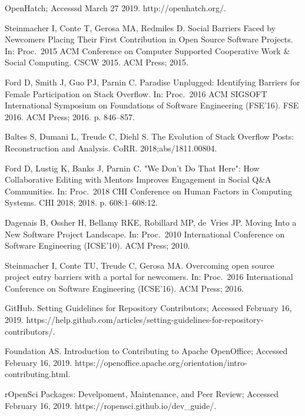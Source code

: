 \documentclass[10pt,letterpaper]{article}
\begin{document}
\begin{thebibliography}{10}
OpenHatch; Accesssd March 27 2019.
\newblock http://openhatch.org/.

Steinmacher I, Conte T, Gerosa MA, Redmiles D.
\newblock Social Barriers Faced by Newcomers Placing Their First Contribution
  in Open Source Software Projects.
\newblock In: Proc.\ 2015 {ACM} Conference on Computer Supported Cooperative
  Work {\&} Social Computing. CSCW 2015. {ACM} Press; 2015.

Ford D, Smith J, Guo PJ, Parnin C.
\newblock Paradise Unplugged: Identifying Barriers for Female Participation on
  Stack Overflow.
\newblock In: Proc.\ 2016 ACM SIGSOFT International Symposium on Foundations of
  Software Engineering ({FSE'16}). FSE 2016. {ACM} Press; 2016. p. 846--857.

Baltes S, Dumani L, Treude C, Diehl S.
\newblock The Evolution of Stack Overflow Posts: Reconstruction and Analysis.
\newblock CoRR. 2018;abs/1811.00804.

Ford D, Lustig K, Banks J, Parnin C.
\newblock "We Don't Do That Here": How Collaborative Editing with Mentors
  Improves Engagement in Social {Q\&A} Communities.
\newblock In: Proc.\ 2018 CHI Conference on Human Factors in Computing Systems.
  CHI 2018; 2018. p. 608:1--608:12.

Dagenais B, Ossher H, Bellamy RKE, Robillard MP, de~Vries JP.
\newblock Moving Into a New Software Project Landscape.
\newblock In: Proc.\ 2010 International Conference on Software Engineering
  ({ICSE'10}). {ACM} Press; 2010.

Steinmacher I, Conte TU, Treude C, Gerosa MA.
\newblock Overcoming open source project entry barriers with a portal for
  newcomers.
\newblock In: Proc.\ 2016 International Conference on Software Engineering
  ({ICSE'16}). {ACM} Press; 2016.

GitHub. Setting Guidelines for Repository Contributors; Accessed February 16,
  2019.
\newblock https://help.github.com/articles/setting-guidelines-for-repository-
  contributors/.

Foundation AS. Introduction to Contributing to Apache OpenOffice; Accessed
  February 16, 2019.
\newblock https://openoffice.apache.org/orientation/intro-contributing.html.

rOpenSci Packages: Develpoment, Maintenance, and Peer Review; Accessed February
  16, 2019.
\newblock https://ropensci.github.io/dev\_guide/.


\end{thebibliography}
\end{document}
